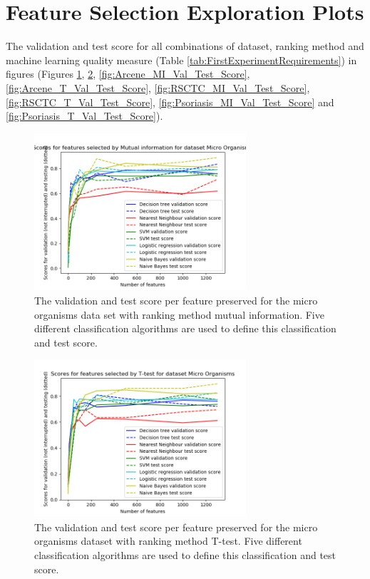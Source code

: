 	
	 
	
	
	\appendix
	
	\section{Feature Selection Exploration Plots}
	\label{app:FeatureSelectionExplorationPlots}
	
	The validation and test score for all combinations of dataset, ranking method and machine learning quality measure (Table \ref{tab:FirstExperimentRequirements}) in figures (Figures \ref{fig:MO_MI_Val_Test_Score}, \ref{fig:MO_T_Val_Test_Score}, \ref{fig:Arcene_MI_Val_Test_Score}, \ref{fig:Arcene_T_Val_Test_Score}, \ref{fig:RSCTC_MI_Val_Test_Score}, \ref{fig:RSCTC_T_Val_Test_Score}, \ref{fig:Psoriasis_MI_Val_Test_Score} and \ref{fig:Psoriasis_T_Val_Test_Score}). 
	
	\begin{figure}[H]
		\includegraphics[width=0.7\textwidth]{MO_MI_Val_Test_Score.png}
		\caption{The validation and test score per feature preserved for the micro organisms data set with ranking method mutual information. Five different classification algorithms are used to define this classification and test score.}
		\label{fig:MO_MI_Val_Test_Score}
	\end{figure}
	
	\begin{figure}[H]
		\includegraphics[width=0.7\textwidth]{MO_T_Val_Test_Score.png}
		\caption{The validation and test score per feature preserved for the micro organisms dataset with ranking method T-test. Five different classification algorithms are used to define this classification and test score.}
		\label{fig:MO_T_Val_Test_Score}
	\end{figure}

